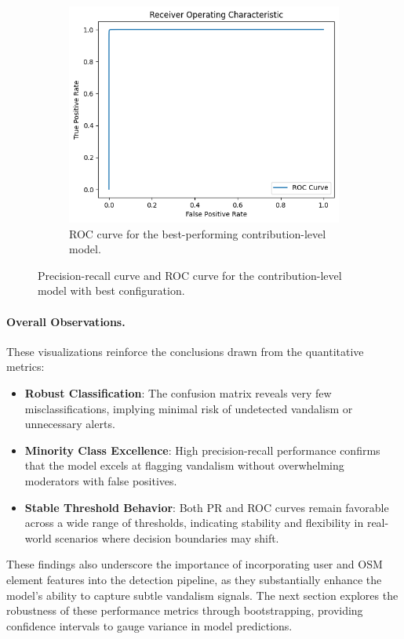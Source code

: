 \documentclass[
    13pt, %
    a4paper, %
    listof=totoc, %
    bibliography=totoc, %
    index=totoc, %
    headsepline
]{scrreprt}
\begin{document}
\begin{figure}[H]
\begin{subfigure}[t]{0.48\textwidth}
        \includegraphics[width=\textwidth]{roc_curve.png}
        \caption{ROC curve for the best-performing contribution-level model.}
        \label{fig:roc_curve}
    \end{subfigure}
    \caption{Precision-recall curve and ROC curve for the contribution-level model with best configuration.}
    \label{fig:pr_roc_combined}
\end{figure}


\paragraph{Overall Observations.}
These visualizations reinforce the conclusions drawn from the quantitative metrics:
\begin{itemize}
    \item \textbf{Robust Classification}: The confusion matrix reveals very few misclassifications, implying minimal risk of undetected vandalism or unnecessary alerts.
    \item \textbf{Minority Class Excellence}: High precision-recall performance confirms that the model excels at flagging vandalism without overwhelming moderators with false positives.
    \item \textbf{Stable Threshold Behavior}: Both PR and ROC curves remain favorable across a wide range of thresholds, indicating stability and flexibility in real-world scenarios where decision boundaries may shift.
\end{itemize}

These findings also underscore the importance of incorporating user and OSM element features into the detection pipeline, as they substantially enhance the model’s ability to capture subtle vandalism signals. The next section explores the robustness of these performance metrics through bootstrapping, providing confidence intervals to gauge variance in model predictions.
\end{document}
